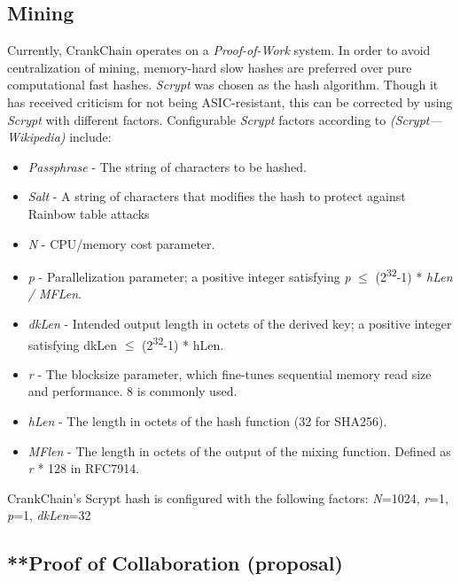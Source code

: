 \documentclass[10pt,twocolumn]{article}
\begin{document}
\subsection{Mining}
Currently, CrankChain operates on a \textit{Proof-of-Work}\cite{conf:nakamoto} system.  In order to avoid centralization of mining, memory-hard slow hashes are preferred over pure computational fast hashes. \textit{Scrypt} was chosen as the hash algorithm.  Though it has received criticism for not being ASIC-resistant, this can be corrected by using \textit{Scrypt} with different factors.  Configurable \textit{Scrypt} factors according to \textit{(Scrypt---Wikipedia)}\cite{wiki:scrypt} include:
\begin{itemize}
\item \textit{Passphrase} - The string of characters to be hashed.
\item \textit{Salt} - A string of characters that modifies the hash to protect against Rainbow table attacks
\item \textit{N} - CPU/memory cost parameter.
\item \textit{p} - Parallelization parameter; a positive integer satisfying \textit{p} $\leq$ (2\textsuperscript{32}-1) * \textit{hLen / MFLen}.
\item \textit{dkLen} - Intended output length in octets of the derived key; a positive integer satisfying dkLen $\leq$ (2\textsuperscript{32}-1) * hLen.
\item \textit{r} - The blocksize parameter, which fine-tunes sequential memory read size and performance. 8 is commonly used.
\item \textit{hLen} - The length in octets of the hash function (32 for SHA256).
\item \textit{MFlen} - The length in octets of the output of the mixing function. Defined as \textit{r} * 128 in RFC7914.
\end{itemize}
CrankChain's Scrypt hash is configured with the following factors: \textit{N}=1024, \textit{r}=1, \textit{p}=1, \textit{dkLen}=32
\subsection{**Proof of Collaboration (proposal)}
\end{document}
